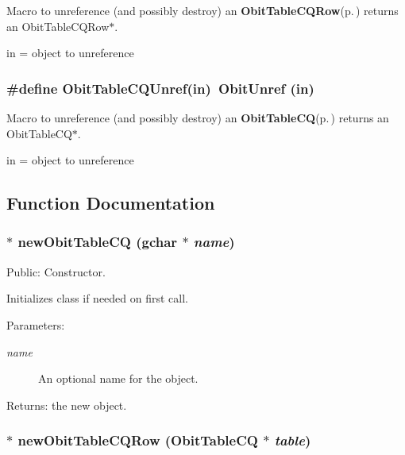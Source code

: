 Macro to unreference (and possibly destroy) an {\bf Obit\-Table\-CQRow}{\rm (p.\,\pageref{structObitTableCQRow})} returns an Obit\-Table\-CQRow$\ast$. 

in = object to unreference 
\subsubsection{\setlength{\rightskip}{0pt plus 5cm}\#define Obit\-Table\-CQUnref(in)\ Obit\-Unref (in)}\label{ObitTableCQ_8h_a1}


Macro to unreference (and possibly destroy) an {\bf Obit\-Table\-CQ}{\rm (p.\,\pageref{structObitTableCQ})} returns an Obit\-Table\-CQ$\ast$. 

in = object to unreference 

\subsection{Function Documentation}
\subsubsection{$\ast$ new\-Obit\-Table\-CQ (gchar $\ast$ {\em name})}\label{ObitTableCQ_8h_a11}


Public: Constructor. 

Initializes class if needed on first call. \begin{Desc}
\item[Parameters:]
\begin{description}
\item[{\em name}]An optional name for the object. \end{description}
\end{Desc}
\begin{Desc}
\item[Returns:]the new object. \end{Desc}
\subsubsection{$\ast$ new\-Obit\-Table\-CQRow ({\bf Obit\-Table\-CQ} $\ast$ {\em table})}\label{ObitTableCQ_8h_a8}


